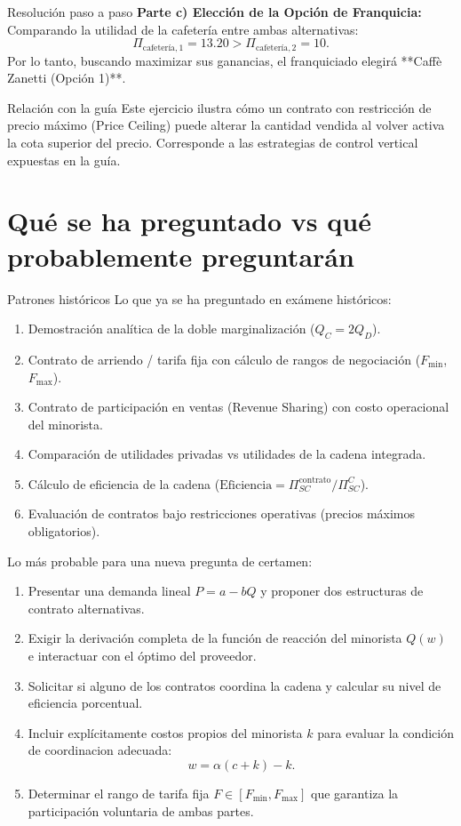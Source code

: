 \documentclass[11pt,a4paper]{article}
\begin{document}
\begin{pauta}{Resolución paso a paso}
\textbf{Parte c) Elección de la Opción de Franquicia:}
Comparando la utilidad de la cafetería entre ambas alternativas:
\[
\Pi_{\text{cafetería},1} = 13.20 > \Pi_{\text{cafetería},2} = 10.
\]
Por lo tanto, buscando maximizar sus ganancias, el franquiciado elegirá **Caffè Zanetti (Opción 1)**.
\end{pauta}

\begin{analisis}{Relación con la guía}
Este ejercicio ilustra cómo un contrato con restricción de precio máximo (Price Ceiling) puede alterar la cantidad vendida al volver activa la cota superior del precio. Corresponde a las estrategias de control vertical expuestas en la guía.
\end{analisis}

\section{Qué se ha preguntado vs qué probablemente preguntarán}

\begin{analisis}{Patrones históricos}
Lo que ya se ha preguntado en exámene históricos:
\begin{enumerate}[itemsep=2pt]
    \item Demostración analítica de la doble marginalización (\(Q_C = 2Q_D\)).
    \item Contrato de arriendo / tarifa fija con cálculo de rangos de negociación (\(F_{\min}\), \(F_{\max}\)).
    \item Contrato de participación en ventas (Revenue Sharing) con costo operacional del minorista.
    \item Comparación de utilidades privadas vs utilidades de la cadena integrada.
    \item Cálculo de eficiencia de la cadena (\(\text{Eficiencia} = \Pi_{SC}^{\text{contrato}} / \Pi_{SC}^C\)).
    \item Evaluación de contratos bajo restricciones operativas (precios máximos obligatorios).
\end{enumerate}

Lo más probable para una nueva pregunta de certamen:
\begin{enumerate}[itemsep=2pt]
    \item Presentar una demanda lineal \(P = a - bQ\) y proponer dos estructuras de contrato alternativas.
    \item Exigir la derivación completa de la función de reacción del minorista \(Q(w)\) e interactuar con el óptimo del proveedor.
    \item Solicitar si alguno de los contratos coordina la cadena y calcular su nivel de eficiencia porcentual.
    \item Incluir explícitamente costos propios del minorista \(k\) para evaluar la condición de coordinacion adecuada:
    \[
    w = \alpha(c + k) - k.
    \]
    \item Determinar el rango de tarifa fija \(F \in [F_{\min}, F_{\max}]\) que garantiza la participación voluntaria de ambas partes.
\end{enumerate}
\end{analisis}
\end{document}
